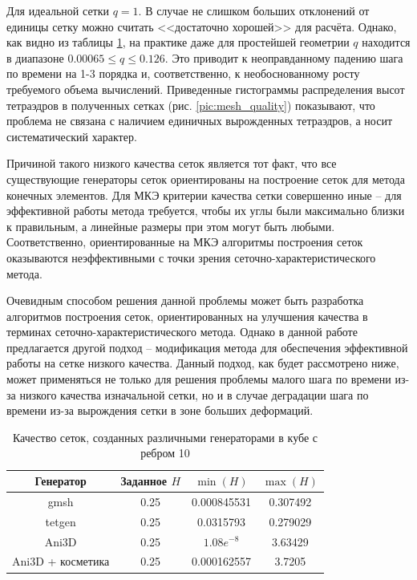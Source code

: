 Для идеальной сетки $q = 1$. В случае не слишком больших отклонений от единицы сетку можно считать <<достаточно хорошей>> для расчёта. Однако, как видно из таблицы \ref{tbl:mesh-stats-summary}, на практике даже для простейшей геометрии $q$ находится в диапазоне $0.00065 \le q \le 0.126$. Это приводит к неоправданному падению шага по времени на 1-3 порядка и, соответственно, к необоснованному росту требуемого объема вычислений. Приведенные гистограммы распределения высот тетраэдров в полученных сетках (рис. \ref{pic:mesh_quality}) показывают, что проблема не связана с наличием единичных вырожденных тетраэдров, а носит систематический характер.

Причиной такого низкого качества сеток является тот факт, что все существующие генераторы сеток ориентированы на построение сеток для метода конечных элементов. Для МКЭ критерии качества сетки совершенно иные -- для эффективной работы метода требуется, чтобы их углы были максимально близки к правильным, а линейные размеры при этом могут быть любыми. Соответственно, ориентированные на МКЭ алгоритмы построения сеток оказываются неэффективными с точки зрения сеточно-характеристического метода.

Очевидным способом решения данной проблемы может быть разработка алгоритмов построения сеток, ориентированных на улучшения качества в терминах сеточно-характеристического метода. Однако в данной работе предлагается другой подход -- модификация метода для обеспечения эффективной работы на сетке низкого качества. Данный подход, как будет рассмотрено ниже, может применяться не только для решения проблемы малого шага по времени из-за низкого качества изначальной сетки, но и в случае деградации шага по времени из-за вырождения сетки в зоне больших деформаций.

\begin{table}[h]
\centering
\caption{Качество сеток, созданных различными генераторами в кубе с ребром 10}
\begin{tabular}{|c|c|c|c|}
\hline
Генератор & Заданное $H$ & $\min(H)$ & $\max(H)$ \\
\hline
gmsh & 0.25 & 0.000845531 & 0.307492 \\
tetgen & 0.25 & 0.0315793 & 0.279029 \\
Ani3D & 0.25 & $1.08e^{-8}$ & 3.63429 \\
Ani3D + косметика & 0.25 & 0.000162557 & 3.7205 \\
\hline
\end{tabular}
\label{tbl:mesh-stats-summary}
\end{table}


